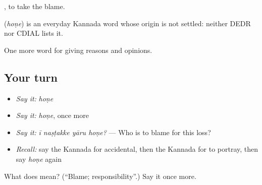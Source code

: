  , to take the blame.

\begin{cousinweb}
\textbf{} (\emph{hoṇe}) is an everyday Kannada word whose origin is not settled: neither DEDR nor CDIAL lists it.
\end{cousinweb}

\begin{grammarlens}[title={What you've built}]
One more word for giving reasons and opinions.
\end{grammarlens}

\subsection*{Your turn}
\begin{itemize}
\raggedright
  \item \emph{Say it:} \emph{hoṇe}
  \item \emph{Say it:} \emph{hoṇe}, once more
  \item \emph{Say it:} \emph{ī naṣṭakke yāru hoṇe?} — Who is to blame for this loss?
  \item \emph{Recall:} say the Kannada for accidental, then the Kannada for to portray, then say \emph{hoṇe} again
\end{itemize}

\begin{tcolorbox}[breakable,colback=teal!4,colframe=teal!35!black,title={Before you move on}]
What does  mean? (\textquotedblleft{}Blame; responsibility\textquotedblright{}.) Say it once more.
\end{tcolorbox}
